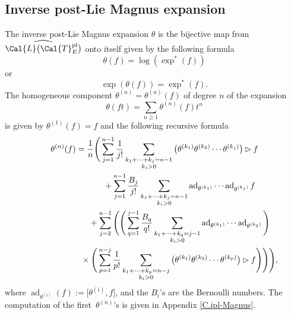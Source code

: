 \documentclass[pdftex]{sigma}
\numberwithin{equation}{section}
\begin{document}
\subsection{Inverse post-Lie Magnus expansion}

The inverse post-Lie Magnus expansion $\theta$ is the bijective map from $\widehat{\Cal{L}\big(\Cal{T}^{\rm pl}_E\big)}$ onto itself given by the following formula
\begin{equation}\label{IPLME}
\theta(f) = \log(\exp^*(f))
\end{equation}
or
\begin{equation*}%
\exp(\theta(f)) = \exp^*(f).
\end{equation*}
The homogeneous component $\theta^{(n)}=\theta^{(n)}(f)$ of degree $n$ of the expansion
\begin{displaymath}
\theta(ft)=\sum_{n\geq 1}{\theta^{(n)}(f)t^n}
\end{displaymath}
is given by $\theta^{(1)}(f)=f$ and the following recursive formula \cite{ELM2015}
\begin{gather}
\theta^{(n)}(f)
= \frac{1}{n} \Bigg( \sum_{j=1}^{n-1}{\frac{1}{j!}\sum_{\substack{k_1 + \cdots + k_j = n-1 \\ k_i>0}}
{\big(\theta^{(k_1)}\theta^{(k_2)} \cdots \theta^{(k_j)}\big) \rhd f}}\nonumber
\\ \hphantom{\theta^{(n)}(f)=\frac{1}{n} \Bigg(}
+ \sum_{j=1}^{n-1}{\frac{B_j}{j!}\sum_{\substack{k_1 + \cdots + k_j = n-1 \\ k_i>0}}
{\operatorname{ad}_{\theta^{(k_1)}} \cdots \operatorname{ad}_{\theta^{(k_j)}} f}}\nonumber
\\ \hphantom{\theta^{(n)}(f)=\frac{1}{n} \Bigg(}
{}+ \sum_{j=2}^{n-1} \Bigg(\Bigg( \sum_{q=1}^{j-1}{\frac{B_q}{q!}
\sum_{\substack{k_1 + \cdots + k_q = j-1 \\ k_i>0}}\operatorname{ad}_{\theta^{(k_1)}} \cdots \operatorname{ad}_{\theta^{(k_q)}} \Bigg)}\nonumber
\\ \hphantom{\theta^{(n)}(f)=\frac{1}{n} \Bigg(}
{}\times\Bigg(\sum_{p=1}^{n-j}{\frac{1}{p!}\sum_{\substack{k_1 + \cdots + k_p = n-j \\
k_i>0}}{\big(\theta^{(k_1)}\theta^{(k_2)} \cdots \theta^{(k_p)}\big) \rhd f}} \Bigg)\Bigg)\Bigg),
\label{IPL}
\end{gather}
where $\operatorname{ad}_{\theta^{(i)}}(f):= \big[\theta^{(i)}, f\big]$, and the $B_i$'s are the Bernoulli numbers. The computation of the first~$\theta^{(n)}$'s is given in Appendix \ref{C.ipl-Magnus}.
\end{document}
